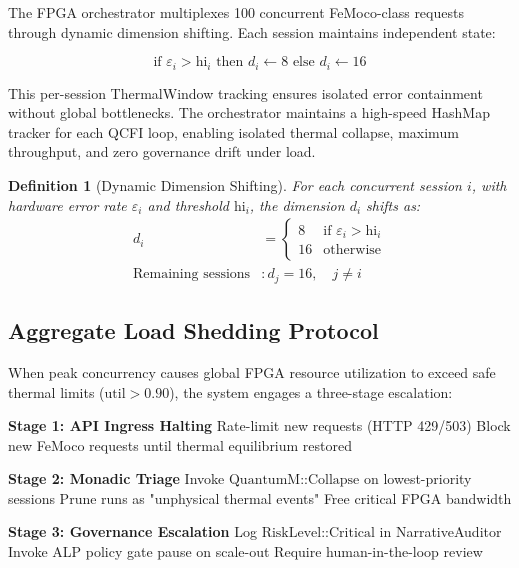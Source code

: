 \documentclass[11pt,a4paper]{article}
\newtheorem{definition}{Definition}
\theoremstyle{plain}
\begin{document}
The FPGA orchestrator multiplexes 100 concurrent FeMoco-class requests through dynamic dimension shifting. Each session maintains independent state:

\begin{equation}
    \text{if } \varepsilon_i > \text{hi}_i \text{ then } d_i \leftarrow 8 \text{ else } d_i \leftarrow 16
\end{equation}

This per-session ThermalWindow tracking ensures isolated error containment without global bottlenecks. The orchestrator maintains a high-speed HashMap tracker for each QCFI loop, enabling isolated thermal collapse, maximum throughput, and zero governance drift under load.

\begin{definition}[Dynamic Dimension Shifting]
For each concurrent session $i$, with hardware error rate $\varepsilon_i$ and threshold $\text{hi}_i$, the dimension $d_i$ shifts as:
\begin{align}
    d_i &= \begin{cases}
        8 & \text{if } \varepsilon_i > \text{hi}_i \\
        16 & \text{otherwise}
    \end{cases} \\
    \text{Remaining sessions} &: d_j = 16, \quad j \neq i
\end{align}
\end{definition}

\subsection{Aggregate Load Shedding Protocol}

When peak concurrency causes global FPGA resource utilization to exceed safe thermal limits ($\text{util} > 0.90$), the system engages a three-stage escalation:

\begin{algorithm}
\caption{Aggregate Load Shedding Protocol}
\label{alg:loadshed}
\begin{algorithmic}[1]
\State \textbf{Stage 1: API Ingress Halting}
\State Rate-limit new requests (HTTP 429/503)
\State Block new FeMoco requests until thermal equilibrium restored

\State \textbf{Stage 2: Monadic Triage}
\State Invoke $\text{QuantumM::Collapse}$ on lowest-priority sessions
\State Prune runs as "unphysical thermal events"
\State Free critical FPGA bandwidth

\State \textbf{Stage 3: Governance Escalation}
\State Log $\text{RiskLevel::Critical}$ in NarrativeAuditor
\State Invoke ALP policy gate pause on scale-out
\State Require human-in-the-loop review
\end{algorithmic}
\end{algorithm}
\end{document}
